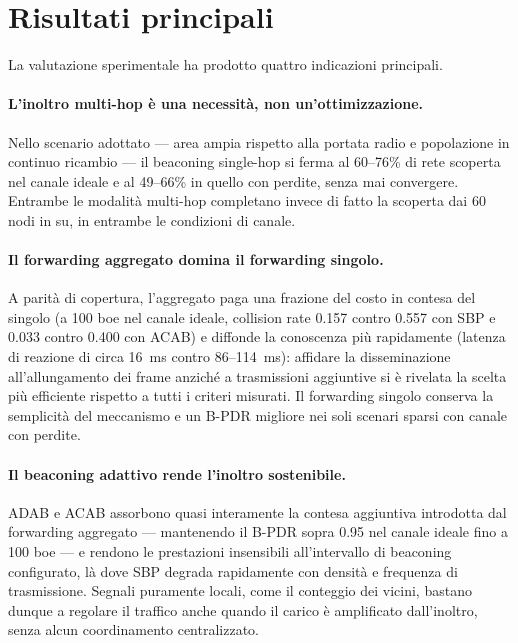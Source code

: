 \section{Risultati principali}
\label{sec:concl-risultati}
La valutazione sperimentale ha prodotto quattro indicazioni principali.

\paragraph{L'inoltro multi-hop \`e una necessit\`a, non un'ottimizzazione.}
Nello scenario adottato --- area ampia rispetto alla portata radio e
popolazione in continuo ricambio --- il beaconing single-hop si ferma al
60--76\% di rete scoperta nel canale ideale e al 49--66\% in quello con
perdite, senza mai convergere. Entrambe le modalit\`a multi-hop completano
invece di fatto la scoperta dai 60 nodi in su, in entrambe le condizioni di
canale.

\paragraph{Il forwarding aggregato domina il forwarding singolo.} A parit\`a
di copertura, l'aggregato paga una frazione del costo in contesa del singolo
(a 100 boe nel canale ideale, collision rate 0.157 contro 0.557 con SBP e
0.033 contro 0.400 con ACAB) e diffonde la conoscenza pi\`u rapidamente
(latenza di reazione di circa \SI{16}{ms} contro 86--114~\si{ms}): affidare
la disseminazione all'allungamento dei frame anzich\'e a trasmissioni
aggiuntive si \`e rivelata la scelta pi\`u efficiente rispetto a tutti i criteri
misurati. Il forwarding singolo conserva la semplicit\`a del meccanismo e un
B-PDR migliore nei soli scenari sparsi con canale con perdite.

\paragraph{Il beaconing adattivo rende l'inoltro sostenibile.} ADAB e ACAB
assorbono quasi interamente la contesa aggiuntiva introdotta dal forwarding
aggregato --- mantenendo il B-PDR sopra 0.95 nel canale ideale fino a 100 boe
--- e rendono le prestazioni insensibili all'intervallo di beaconing
configurato, l\`a dove SBP degrada rapidamente con densit\`a e frequenza di
trasmissione. Segnali puramente locali, come il conteggio dei vicini,
bastano dunque a regolare il traffico anche quando il carico \`e amplificato
dall'inoltro, senza alcun coordinamento centralizzato.

